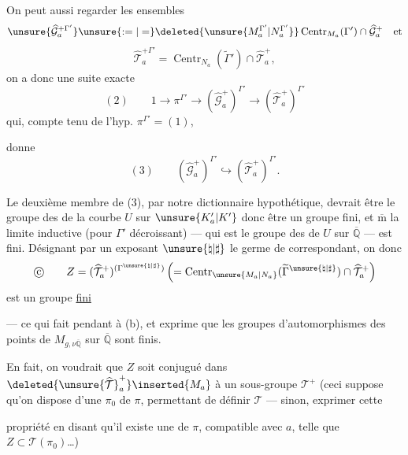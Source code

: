 On peut aussi regarder les ensembles
\[
\unsure{\widehat{\mathcal G}_a^{+\Gamma'}}
\unsure{:=|=}
\deleted{\unsure{M_a^{\Gamma'}|N_a^{\Gamma'}}}
\operatorname{Centr}_{M_a}(\Gamma')\cap\widehat{\mathcal G}_a^+
\quad\text{et}
\]
\[
\widehat{\mathcal T}_a^{+\Gamma'}
=\operatorname{Centr}_{N_a}(\widetilde{\Gamma}')\cap\widehat{\mathcal T}_a^+,
\]
 on a donc une suite exacte
\[
(2)\qquad 1\longrightarrow\pi^{\Gamma'}\longrightarrow
(\widehat{\mathcal G}_a^+)^{\Gamma'}\longrightarrow
(\widehat{\mathcal T}_a^+)^{\Gamma'}
\]
qui, compte tenu de l'hyp. $\pi^{\Gamma'}=(1)$,


donne
\[
(3)\qquad (\widehat{\mathcal G}_a^+)^{\Gamma'}
\hookrightarrow (\widehat{\mathcal T}_a^+)^{\Gamma'}.
\]

Le deuxième membre de (3), par notre dictionnaire hypothétique, devrait être  le groupe des  de la courbe $U$ sur $\unsure{K'_a|K'}$ donc être un groupe fini, et $\overline{\mathrm m}$  la limite inductive (pour $\Gamma'$ décroissant) --- qui est le groupe des  de $U$ sur $\overline{\mathbb Q}$ --- est fini. Désignant par un exposant $\unsure{\natural|\sharp}$ le germe de  correspondant, on  donc
\[
\text{\textcircled{c}}\qquad
Z=(\widehat{\mathcal T}_a^+)^{(\Gamma^{\unsure{\natural|\sharp}})}
\left(=\operatorname{Centr}_{\unsure{M_a|N_a}}
(\widetilde{\Gamma}^{\unsure{\natural|\sharp}})\cap\widehat{\mathcal T}_a^+\right)
\]
est un groupe \uline{fini}

--- ce qui fait pendant à (b), et exprime que les groupes d'automorphismes des points de $M_{g,\nu\overline{\mathbb Q}}$ sur $\overline{\mathbb Q}$ sont finis.

En fait, on voudrait que $Z$ soit conjugué dans $\deleted{\unsure{\widehat{\mathcal T}}_a^+}\inserted{M_a}$ à un sous-groupe   $\mathcal T^+$  (ceci suppose qu'on dispose d'une   $\pi_0$ de $\pi$, permettant de définir $\mathcal T$ --- sinon,  exprimer cette


propriété en disant qu'il existe une   de $\pi$, compatible avec $a$, telle que $Z\subset\mathcal T(\pi_0)$\ldots)

